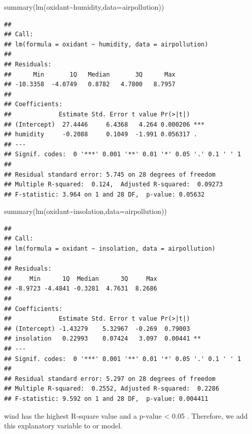 \documentclass[
]{article}
\newenvironment{Shaded}{\begin{snugshade}}{\end{snugshade}}
\newcommand{\AttributeTok}[1]{\textcolor[rgb]{0.77,0.63,0.00}{#1}}
\newcommand{\FunctionTok}[1]{\textcolor[rgb]{0.00,0.00,0.00}{#1}}
\newcommand{\NormalTok}[1]{#1}
\newcommand{\SpecialCharTok}[1]{\textcolor[rgb]{0.00,0.00,0.00}{#1}}
\begin{document}
\begin{Shaded}
\begin{Highlighting}[]
\FunctionTok{summary}\NormalTok{(}\FunctionTok{lm}\NormalTok{(oxidant}\SpecialCharTok{\textasciitilde{}}\NormalTok{humidity,}\AttributeTok{data=}\NormalTok{airpollution))}
\end{Highlighting}
\end{Shaded}

\begin{verbatim}
## 
## Call:
## lm(formula = oxidant ~ humidity, data = airpollution)
## 
## Residuals:
##      Min       1Q   Median       3Q      Max 
## -10.3358  -4.0749   0.8782   4.7800   8.7957 
## 
## Coefficients:
##             Estimate Std. Error t value Pr(>|t|)    
## (Intercept)  27.4446     6.4368   4.264 0.000206 ***
## humidity     -0.2088     0.1049  -1.991 0.056317 .  
## ---
## Signif. codes:  0 '***' 0.001 '**' 0.01 '*' 0.05 '.' 0.1 ' ' 1
## 
## Residual standard error: 5.745 on 28 degrees of freedom
## Multiple R-squared:  0.124,  Adjusted R-squared:  0.09273 
## F-statistic: 3.964 on 1 and 28 DF,  p-value: 0.05632
\end{verbatim}

\begin{Shaded}
\begin{Highlighting}[]
\FunctionTok{summary}\NormalTok{(}\FunctionTok{lm}\NormalTok{(oxidant}\SpecialCharTok{\textasciitilde{}}\NormalTok{insolation,}\AttributeTok{data=}\NormalTok{airpollution))}
\end{Highlighting}
\end{Shaded}

\begin{verbatim}
## 
## Call:
## lm(formula = oxidant ~ insolation, data = airpollution)
## 
## Residuals:
##     Min      1Q  Median      3Q     Max 
## -8.9723 -4.4841 -0.3281  4.7631  8.2686 
## 
## Coefficients:
##             Estimate Std. Error t value Pr(>|t|)   
## (Intercept) -1.43279    5.32967  -0.269  0.79003   
## insolation   0.22993    0.07424   3.097  0.00441 **
## ---
## Signif. codes:  0 '***' 0.001 '**' 0.01 '*' 0.05 '.' 0.1 ' ' 1
## 
## Residual standard error: 5.297 on 28 degrees of freedom
## Multiple R-squared:  0.2552, Adjusted R-squared:  0.2286 
## F-statistic: 9.592 on 1 and 28 DF,  p-value: 0.004411
\end{verbatim}

wind has the highest R-square value and a p-value \textless{} 0.05 .
Therefore, we add this explanatory variable to or model.
\end{document}
